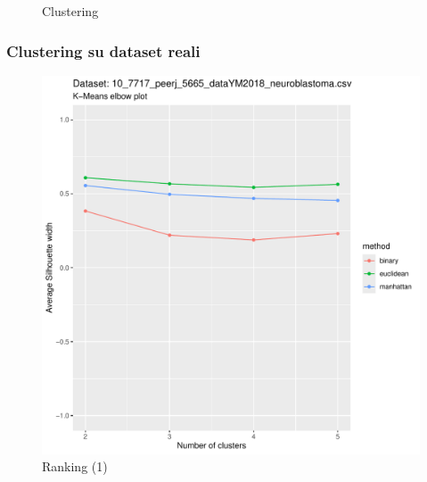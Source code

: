 \documentclass{beamer}
\begin{document}
\begin{frame}
\begin{boxedminipage}{0.49\textwidth}
\begin{figure}
                    \caption{Clustering}
                \end{figure}
            \end{boxedminipage}
        \end{frame}

	\begin{frame}
            \frametitle{Clustering su dataset reali}

	    \centering
            \begin{boxedminipage}{0.49\textwidth}
                \begin{figure}
                    \includegraphics[width = \textwidth, page = 9]{results/results_Neuroblastoma.csv.pdf}
                    \caption{Ranking (1)}
                \end{figure}
            \end{boxedminipage}
            \begin{boxedminipage}{0.49\textwidth}
                \begin{figure}

\end{figure}
\end{boxedminipage}
\end{frame}
\end{document}

